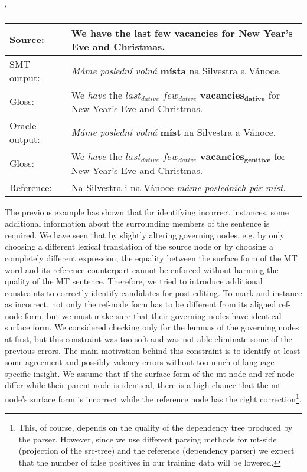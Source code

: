 \begin{myexample}
    \small
    \catcode`
    \begin{center}
    \begin{tabular}{|l|p{}|}
    \hline
    \textbf{Source:}  &  \textbf{We have the last few vacancies for New Year's Eve and Christmas.}  \\
    \hline
    SMT output:  &  \textit{Máme} \textit{poslední} \textit{volná} \textbf{místa} na Silvestra a Vánoce.  \\
    \hline
    Gloss:  &  We \textit{have} the $\mathit{last_{dative}}$ $\mathit{few_{dative}}$ $\mathbf{vacancies_{dative}}$ for New Year's Eve and Christmas.  \\
    \hline
    Oracle output:  &  \textit{Máme} \textit{poslední} \textit{volná} \textbf{míst} na Silvestra a Vánoce.  \\
    \hline
    Gloss:  &  We \textit{have} the $\mathit{last_{dative}}$ $\mathit{few_{dative}}$ $\mathbf{vacancies_{genitive}}$ for New Year's Eve and Christmas.  \\
    \hline
    Reference:  &  Na Silvestra i na Vánoce \textit{máme} \textit{posledních} \textit{pár} \textit{míst}.  \\
    \hline
    \end{tabular}
    \label{ex-oracle-noref}
    \end{center}
\end{myexample}

The previous example has shown that for identifying incorrect instances, some additional information
about the surrounding members of the sentence is required.
We have seen that by slightly altering governing nodes, e.g.
by only choosing a different lexical translation of the source node or by choosing a completely different expression,
the equality between the surface form of the MT word and its reference counterpart cannot
be enforced without harming the quality of the MT sentence.
Therefore, we tried to introduce additional constraints to correctly identify candidates for post-editing.
To mark and instance as incorrect, not only the ref-node form has to be different from its aligned
ref-node form, but we must make sure that their governing nodes have identical surface form.
We considered checking only for the lemmas of the governing nodes at first, but this constraint
was too soft and was not able eliminate some of the previous errors.
The main motivation behind this constraint is to identify at least some agreement and possibly valency errors
without too much of language-specific insight. We assume that if the surface form of the mt-node and ref-node
differ while their parent node is identical, there is a high chance that the mt-node's surface form is
incorrect while the reference node has the right correction\footnote{This, of course, depends on the quality of the dependency
tree produced by the parser. However, since we use different parsing methods for mt-side (projection of the src-tree) and
the reference (dependency parser) we expect that the number of false positives in our training data will be lowered.}.


